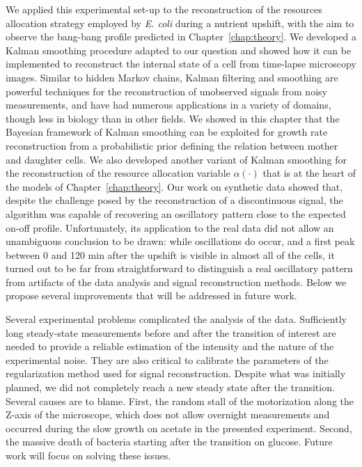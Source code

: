 We applied this experimental set-up to the reconstruction of the resources allocation strategy employed by \textit{E. coli} during a nutrient upshift, with the aim to observe the bang-bang profile predicted in Chapter~\ref{chap:theory}.
We developed a Kalman smoothing procedure adapted to our question and showed how it can be implemented to reconstruct the internal state of a cell from time-lapse microscopy images.
Similar to hidden Markov chains, Kalman filtering and smoothing are powerful techniques for the reconstruction of unobserved signals from noisy measurements, and have had numerous applications in a variety of domains, though less in biology than in other fields.
We showed in this chapter that the Bayesian framework of Kalman smoothing can be exploited for growth rate reconstruction from a probabilistic prior defining the relation between mother and daughter cells.
We also developed another variant of Kalman smoothing for the reconstruction of the resource allocation variable $\alpha (\cdot)$ that is at the heart of the models of Chapter~\ref{chap:theory}.
Our work on synthetic data showed that, despite the challenge posed by the reconstruction of a discontinuous signal, the algorithm was capable of recovering an oscillatory pattern close to the expected on-off profile.
Unfortunately, its application to the real data did not allow an unambiguous conclusion to be drawn: while oscillations do occur, and a first peak between 0 and 120 min after the upshift is visible in almost all of the cells, it turned out to be far from straightforward to distinguish a real oscillatory pattern from artifacts of the data analysis and signal reconstruction methods.
Below we propose several improvements that will be addressed in future work.

Several experimental problems complicated the analysis of the data.
Sufficiently long steady-state measurements before and after the transition of interest are needed to provide a reliable estimation of the intensity and the nature of the experimental noise.
They are also critical to calibrate the parameters of the regularization method used for signal reconstruction.
Despite what was initially planned, we did not completely reach a new steady state after the transition.
Several causes are to blame.
First, the random stall of the motorization along the Z-axis of the microscope, which does not allow overnight measurements and occurred during the slow growth on acetate in the presented experiment.
Second, the massive death of bacteria starting after the transition on glucose.
Future work will focus on solving these issues.

